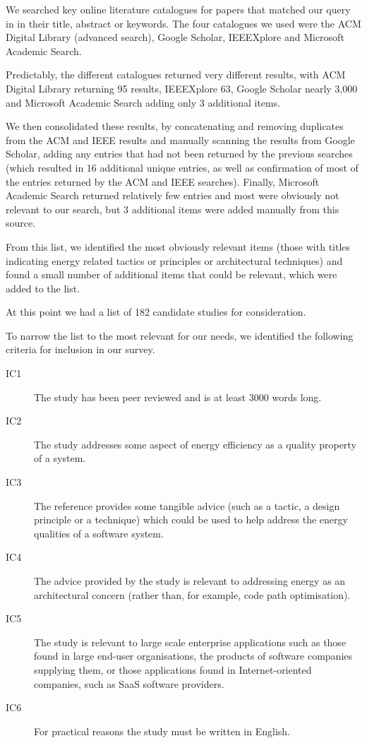 We searched key online literature catalogues for papers that matched our query in in their title, abstract or keywords.  The four catalogues we used were the ACM Digital Library (advanced search), Google Scholar, IEEEXplore and Microsoft Academic Search.

Predictably, the different catalogues returned very different results, with ACM Digital Library returning 95 results, IEEEXplore 63, Google Scholar nearly 3,000 and Microsoft Academic Search adding only 3 additional items.

We then consolidated these results, by concatenating and removing duplicates from the ACM and IEEE results and manually scanning the results from Google Scholar, adding any entries that had not been returned by the previous searches (which resulted in 16 additional unique entries, as well as confirmation of most of the entries returned by the ACM and IEEE searches).  Finally, Microsoft Academic Search returned relatively few entries and most were obviously not relevant to our search, but 3 additional items were added manually from this source.

From this list, we identified the most obviously relevant items (those with titles indicating energy related tactics or principles or architectural techniques) and found a small number of additional items that could be relevant, which were added to the list.

At this point we had a list of 182 candidate studies for consideration.

To narrow the list to the most relevant for our needs, we identified the following criteria for inclusion in our survey.

\begin{description}
	\item[IC1] The study has been peer reviewed and is at least 3000 words long.
	\item[IC2] The study addresses some aspect of energy efficiency as a quality property of a system.
	\item[IC3] The reference provides some tangible advice (such as a tactic, a design principle or a technique) which could be used to help address the energy qualities of a software system.
	\item[IC4] The advice provided by the study is relevant to addressing energy as an architectural concern (rather than, for example, code path optimisation).
	\item[IC5] The study is relevant to large scale enterprise applications such as those found in large end-user organisations, the products of software companies supplying them, or those applications found in Internet-oriented companies, such as SaaS software providers.
	\item[IC6] For practical reasons the study must be written in English.
\end{description}

